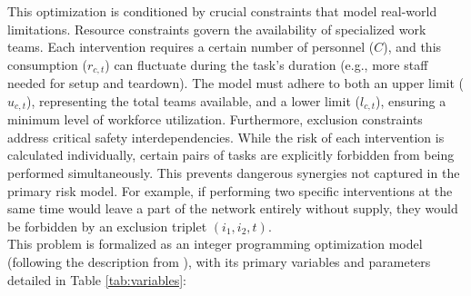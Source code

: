 This optimization is conditioned by crucial constraints that model real-world limitations. Resource constraints govern the availability of specialized work teams. Each intervention requires a certain number of personnel ($C$), and this consumption ($r_{c,t}$) can fluctuate during the task's duration (e.g., more staff needed for setup and teardown). The model must adhere to both an upper limit ($u_{c,t}$), representing the total teams available, and a lower limit ($l_{c,t}$), ensuring a minimum level of workforce utilization. Furthermore, exclusion constraints address critical safety interdependencies. While the risk of each intervention is calculated individually, certain pairs of tasks are explicitly forbidden from being performed simultaneously. This prevents dangerous synergies not captured in the primary risk model. For example, if performing two specific interventions at the same time would leave a part of the network entirely without supply, they would be forbidden by an exclusion triplet $(i_1, i_2, t)$.\\

This problem is formalized as an integer programming optimization model (following the description from \cite{ConsueloRoadef}), with its primary variables and parameters detailed in Table \ref{tab:variables}:


